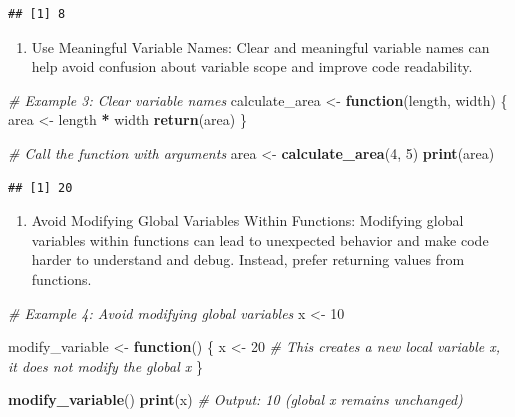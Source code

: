 \documentclass[
]{book}
\newenvironment{Shaded}{\begin{snugshade}}{\end{snugshade}}
\newcommand{\CommentTok}[1]{\textcolor[rgb]{0.56,0.35,0.01}{\textit{#1}}}
\newcommand{\ControlFlowTok}[1]{\textcolor[rgb]{0.13,0.29,0.53}{\textbf{#1}}}
\newcommand{\DecValTok}[1]{\textcolor[rgb]{0.00,0.00,0.81}{#1}}
\newcommand{\FunctionTok}[1]{\textcolor[rgb]{0.13,0.29,0.53}{\textbf{#1}}}
\newcommand{\NormalTok}[1]{#1}
\newcommand{\OtherTok}[1]{\textcolor[rgb]{0.56,0.35,0.01}{#1}}
\newcommand{\SpecialCharTok}[1]{\textcolor[rgb]{0.81,0.36,0.00}{\textbf{#1}}}
\providecommand{\tightlist}{%
  \setlength{\itemsep}{0pt}\setlength{\parskip}{0pt}}
\begin{document}
\begin{verbatim}
## [1] 8
\end{verbatim}

\begin{enumerate}
\def\labelenumi{\arabic{enumi}.}
\setcounter{enumi}{1}
\tightlist
\item
  Use Meaningful Variable Names: Clear and meaningful variable names can help avoid confusion about variable scope and improve code readability.
\end{enumerate}

\begin{Shaded}
\begin{Highlighting}[]
\CommentTok{\# Example 3: Clear variable names}
\NormalTok{calculate\_area }\OtherTok{\textless{}{-}} \ControlFlowTok{function}\NormalTok{(length, width) \{}
\NormalTok{  area }\OtherTok{\textless{}{-}}\NormalTok{ length }\SpecialCharTok{*}\NormalTok{ width}
  \FunctionTok{return}\NormalTok{(area)}
\NormalTok{\}}

\CommentTok{\# Call the function with arguments}
\NormalTok{area }\OtherTok{\textless{}{-}} \FunctionTok{calculate\_area}\NormalTok{(}\DecValTok{4}\NormalTok{, }\DecValTok{5}\NormalTok{)}
\FunctionTok{print}\NormalTok{(area)  }
\end{Highlighting}
\end{Shaded}

\begin{verbatim}
## [1] 20
\end{verbatim}

\begin{enumerate}
\def\labelenumi{\arabic{enumi}.}
\setcounter{enumi}{2}
\tightlist
\item
  Avoid Modifying Global Variables Within Functions: Modifying global variables within functions can lead to unexpected behavior and make code harder to understand and debug. Instead, prefer returning values from functions.
\end{enumerate}

\begin{Shaded}
\begin{Highlighting}[]
\CommentTok{\# Example 4: Avoid modifying global variables}
\NormalTok{x }\OtherTok{\textless{}{-}} \DecValTok{10}

\NormalTok{modify\_variable }\OtherTok{\textless{}{-}} \ControlFlowTok{function}\NormalTok{() \{}
\NormalTok{  x }\OtherTok{\textless{}{-}} \DecValTok{20}  \CommentTok{\# This creates a new local variable \textquotesingle{}x\textquotesingle{}, it does not modify the global \textquotesingle{}x\textquotesingle{}}
\NormalTok{\}}

\FunctionTok{modify\_variable}\NormalTok{()}
\FunctionTok{print}\NormalTok{(x)  }\CommentTok{\# Output: 10 (global \textquotesingle{}x\textquotesingle{} remains unchanged)}
\end{Highlighting}
\end{Shaded}
\end{document}
